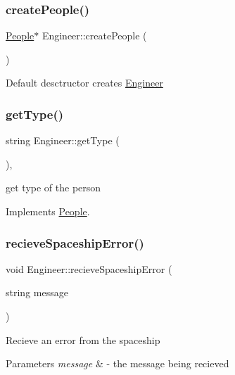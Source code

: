 \subsubsection{\texorpdfstring{create\+People()}{createPeople()}}
{\footnotesize\ttfamily \hyperlink{classPeople}{People}$\ast$ Engineer\+::create\+People (\begin{DoxyParamCaption}{ }\end{DoxyParamCaption})}

Default desctructor creates \hyperlink{classEngineer}{Engineer} \mbox{\label{classEngineer_ae2f83b9c2df3e8d3937697b23546571a}} 
\subsubsection{\texorpdfstring{get\+Type()}{getType()}}
{\footnotesize\ttfamily string Engineer\+::get\+Type (\begin{DoxyParamCaption}{ }\end{DoxyParamCaption})\hspace{0.3cm}{\ttfamily [inline]}, {\ttfamily [virtual]}}

get type of the person 

Implements \hyperlink{classPeople_af60dd882d60cddf63f9b95815ce551a8}{People}.

\mbox{\label{classEngineer_acc86ce6b4b1388be8ebacc685f9e6233}} 
\subsubsection{\texorpdfstring{recieve\+Spaceship\+Error()}{recieveSpaceshipError()}}
{\footnotesize\ttfamily void Engineer\+::recieve\+Spaceship\+Error (\begin{DoxyParamCaption}\item[{string}]{message }\end{DoxyParamCaption})\hspace{0.3cm}{\ttfamily [virtual]}}

Recieve an error from the spaceship 
\begin{DoxyParams}{Parameters}
{\em message} & -\/ the message being recieved \\
\hline
\end{DoxyParams}


